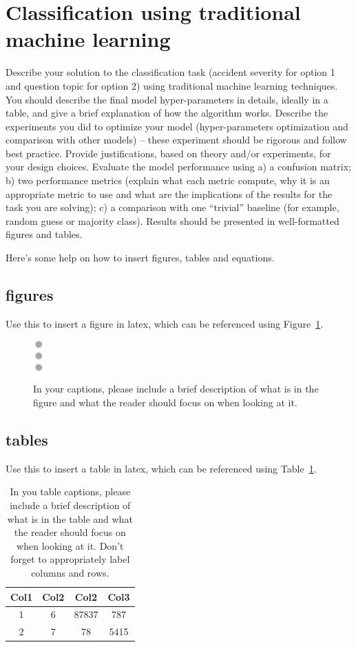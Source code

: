 \documentclass[12pt, a4paper]{article}
\newcommand{\figref}[1]{Figure~\ref{#1}}
\newcommand{\tableref}[1]{Table~\ref{#1}}
\begin{document}
\section{Classification using traditional machine learning}
Describe your solution to the classification task (accident severity for option 1 and question topic for option 2) using traditional machine learning techniques. You should describe the final model hyper-parameters in details, ideally in a table, and give a brief explanation of how the algorithm works. 
Describe the experiments you did to optimize your model (hyper-parameters optimization and comparison with other models) – these experiment should be rigorous and follow best practice. Provide justifications, based on theory and/or experiments, for your design choices.
Evaluate the model performance using a) a confusion matrix; b) two performance metrics (explain what each metric compute, why it is an appropriate metric to use and what are the implications of the results for the task you are solving); c) a comparison with one “trivial” baseline (for example, random guess or majority class). 
Results should be presented in well-formatted figures and tables.

Here's some help on how to insert figures, tables and equations.

\subsection{figures}
Use this to insert a figure in latex, which can be referenced using \figref{examplefig}.

\begin{figure}[htp]
\centering
\includegraphics[width=0.2in]{example_figure.png}
\caption{In your captions, please include a brief description of what is in the figure and what the reader should focus on when looking at it.}
\label{examplefig}
\end{figure}

\subsection{tables}
Use this to insert a table in latex, which can be referenced using \tableref{exampletab}.

\begin{table}[htp]
\centering
\begin{tabular}{c c c c} 
 \hline
 Col1 & Col2 & Col2 & Col3 \\ [0.5ex] 
 \hline\hline
 1 & 6 & 87837 & 787 \\ 
 2 & 7 & 78 & 5415 \\
 \hline
\end{tabular}
\caption{In you table captions, please include a brief description of what is in the table and what the reader should focus on when looking at it. Don't forget to appropriately label columns and rows.}
\label{exampletab}
\end{table}
\end{document}
